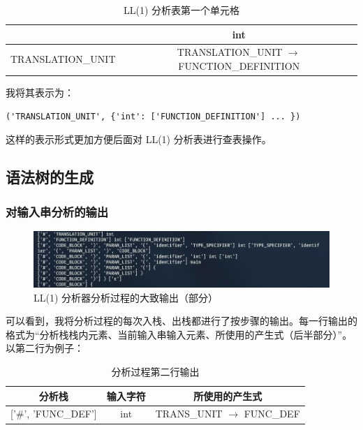 \documentclass[UTF8]{ctexart}
\begin{document}
\begin{table}[H]
  \centering
  \caption{LL(1) 分析表第一个单元格}
  \label{tab:firstcell}
  \begin{tabular}{@{}c|c@{}}
  \toprule
   & int \\ \midrule
  TRANSLATION\_UNIT & TRANSLATION\_UNIT $\rightarrow$ FUNCTION\_DEFINITION \\ \bottomrule
  \end{tabular}
\end{table}

我将其表示为：

\begin{verbatim}
('TRANSLATION_UNIT', {'int': ['FUNCTION_DEFINITION'] ... })
\end{verbatim}

这样的表示形式更加方便后面对 LL(1) 分析表进行查表操作。

\subsection{语法树的生成}
\subsubsection{对输入串分析的输出}
\begin{figure}[h]
  \includegraphics[width=\linewidth]{images/parse.png}
  \caption{LL(1) 分析器分析过程的大致输出（部分）}
  \label{fig:figure6}
\end{figure}

可以看到，我将分析过程的每次入栈、出栈都进行了按步骤的输出。每一行输出的格式为“分析栈栈内元素、当前输入串输入元素、所使用的产生式（后半部分）”。以第二行为例子：

\begin{table}[H]
  \centering
  \caption{分析过程第二行输出}
  \label{tab:parseoutput}
  \begin{tabular}{@{}c|c|c@{}}
  \toprule
  分析栈 & 输入字符 & 所使用的产生式 \\ \midrule
  {[}'\#', 'FUNC\_DEF'{]} & int & TRANS\_UNIT $\rightarrow$ FUNC\_DEF \\ \bottomrule
  \end{tabular}
\end{table}
\end{document}
